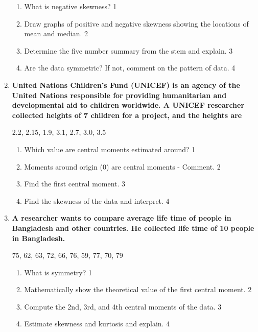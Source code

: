 \documentclass[a4paper,oneside]{book}
\begin{document}
\begin{enumerate}
  \begin{enumerate}
    \item
	What is negative skewness? \hfill 1
    \item
	Draw graphs of positive and negative skewness showing the locations of mean and median. \hfill 2
    \item  
	Determine the five number summary from the stem and explain. \hfill 3
    \item
	Are the data symmetric? If not, comment on the pattern of data. \hfill 4
\end{enumerate}

 \item
	  \textbf{United Nations Children's Fund (UNICEF) is an agency of the United Nations responsible for providing humanitarian and developmental aid to children worldwide. A  UNICEF researcher collected heights of 7 children for a project, and the heights are} 

	\begin{center}
	  2.2, 2.15, 1.9, 3.1, 2.7, 3.0, 3.5
	  	\end{center}
  
  \begin{enumerate}
    \item
	Which value are central moments estimated around? \hfill 1
    \item
	Moments around origin (0) are central moments - Comment. \hfill 2
    \item  
	Find the first central moment. \hfill 3
    \item
	Find the skewness of the data and interpret.  \hfill 4
  \end{enumerate}
  
   \item
	  \textbf{A researcher wants to compare average life time of people in Bangladesh and other countries. He collected life time of 10 people in Bangladesh.} 
	  
	  	\begin{center}
	  75, 62, 63, 72, 66, 76, 59, 77, 70, 79
	  	\end{center}
  
  \begin{enumerate}
    \item
	What is symmetry? \hfill 1
    \item
	Mathematically show the theoretical value of the first central moment. \hfill 2
    \item  
	Compute the 2nd, 3rd, and 4th central moments of the data. \hfill 3
    \item
	Estimate skewness and kurtosis and explain. \hfill 4
  \end{enumerate}

\end{enumerate}
\end{document}
